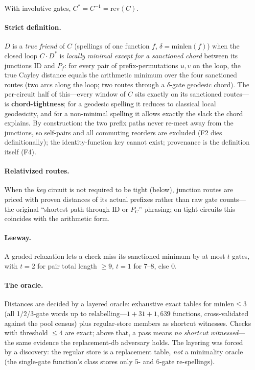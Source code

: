 \documentclass[11pt]{article}
\begin{document}
With involutive gates, $C^{*}=C^{-1}=\mathrm{rev}(C)$.

\paragraph{Strict definition.} $D$ is a \emph{true friend} of $C$
(spellings of one function $f$, $\delta=\mathrm{minlen}(f)$) when the closed
loop $C\cdot D^{*}$ is \emph{locally minimal except for a sanctioned chord}
between its junctions $\mathrm{ID}$ and $P_f$: for every pair of
prefix-permutations $u,v$ on the loop, the true Cayley distance equals the
arithmetic minimum over the four sanctioned routes (two arcs along the loop;
two routes through a $\delta$-gate geodesic chord). The per-circuit half of
this---every window of $C$ sits exactly on its sanctioned routes---is
\textbf{chord-tightness}; for a geodesic spelling it reduces to classical
local geodesicity, and for a non-minimal spelling it allows exactly the slack
the chord explains. By construction: the two prefix paths never re-meet away
from the junctions, so self-pairs and all commuting reorders are excluded
(F2 dies definitionally); the identity-function key cannot exist; provenance
is the definition itself (F4).

\paragraph{Relativized routes.} When the \emph{key} circuit is not required
to be tight (below), junction routes are priced with proven distances of its
actual prefixes rather than raw gate counts---the original ``shortest path
through $\mathrm{ID}$ or $P_C$'' phrasing; on tight circuits this coincides
with the arithmetic form.

\paragraph{Leeway.} A graded relaxation lets a check miss its sanctioned
minimum by at most $t$ gates, with $t=2$ for pair total length $\ge 9$,
$t=1$ for $7$--$8$, else $0$.

\paragraph{The oracle.} Distances are decided by a layered oracle:
exhaustive exact tables for $\mathrm{minlen}\le 3$ (all 1/2/3-gate words up
to relabelling---$1+31+1{,}639$ functions, cross-validated against the pool
census) plus regular-store members as shortcut witnesses. Checks with
threshold $\le 4$ are exact; above that, a pass means \emph{no shortcut
witnessed}---the same evidence the replacement-db adversary holds. The
layering was forced by a discovery: the regular store is a replacement
table, \emph{not} a minimality oracle (the single-gate function's class
stores only 5- and 6-gate re-spellings).
\end{document}
